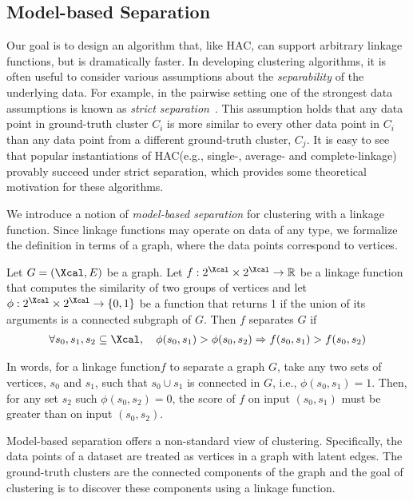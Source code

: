 \documentclass{article} \usepackage[utf8]{inputenc} \usepackage[T1]{fontenc}    \usepackage{hyperref}       \usepackage{url}            \usepackage{booktabs}       \usepackage{amsfonts}       \usepackage{nicefrac}       \usepackage{microtype}      \usepackage{geometry}
\newcommand{\records}{data points\xspace}
\newcommand{\record}{data point\xspace}
\newcommand{\hac}{\textsc{HAC}\xspace}
\newcommand{\hof}{linkage function\xspace}
\newcommand{\hofs}{linkage functions\xspace}
\begin{document}
\subsection{Model-based Separation}
\label{subsec:hsep}
Our goal is to design an algorithm that, like \hac, can support
arbitrary \hofs, but is dramatically faster.
In developing clustering algorithms, it is often useful to consider
various assumptions about the \emph{separability} of the underlying
data.  For example, in the pairwise setting one of the strongest data
assumptions is known as \emph{strict
  separation}~\cite{balcan2008discriminative}. This assumption holds
that any \record in ground-truth cluster $C_i$ is more similar to
every other \record in $C_i$ than any \record from a different
ground-truth cluster, $C_j$. It is easy to see that popular
instantiations of \hac (e.g., single-, average- and complete-linkage)
provably succeed under strict separation, which provides some
theoretical motivation for these algorithms.

We introduce a notion of \emph{model-based separation} for clustering
with a \hof. Since \hofs may operate on data of any type, we formalize
the definition in terms of a graph, where the \records correspond to
vertices.

\begin{definition}
\label{def:hsep}
Let $G = (\Xcal, E)$ be a graph. Let $f: 2^\Xcal \times 2^\Xcal
\rightarrow \mathbb{R}$ be a \hof that computes the similarity of two
groups of vertices and let $\phi: 2^\Xcal \times 2^\Xcal \rightarrow
\{0, 1\}$ be a function that returns 1 if the union of its arguments
is a connected subgraph of $G$. Then $f$ separates $G$ if
\begin{align*}
  \forall s_0, s_1, s_2 \subseteq \Xcal, \quad \phi(s_0, s_1) > \phi(s_0,
  s_2) \Rightarrow f(s_0, s_1) > f(s_0, s_2)
\end{align*}
\end{definition}

\noindent In words, for a \hof $f$ to separate a graph $G$, take any
two sets of vertices, $s_0$ and $s_1$, such that $s_0 \cup s_1$ is
connected in $G$, i.e., $\phi(s_0, s_1) = 1$.  Then, for any set $s_2$
such $\phi(s_0, s_2) = 0$, the score of $f$ on input $(s_0, s_1)$ must
be greater than on input $(s_0, s_2)$.

Model-based separation offers a non-standard view of
clustering. Specifically, the \records of a dataset are treated as
vertices in a graph with latent edges. The ground-truth clusters are
the connected components of the graph and the goal of clustering is
to discover these components using a \hof.
\end{document}
